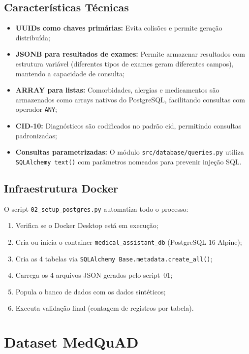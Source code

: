 \subsection{Características Técnicas}

\begin{itemize}
    \item \textbf{UUIDs como chaves primárias:} Evita colisões e permite geração distribuída;
    \item \textbf{JSONB para resultados de exames:} Permite armazenar resultados com estrutura variável (diferentes tipos de exames geram diferentes campos), mantendo a capacidade de consulta;
    \item \textbf{ARRAY para listas:} Comorbidades, alergias e medicamentos são armazenados como arrays nativos do PostgreSQL, facilitando consultas com operador \texttt{ANY};
    \item \textbf{CID-10:} Diagnósticos são codificados no padrão \acrfull{cid}, permitindo consultas padronizadas;
    \item \textbf{Consultas parametrizadas:} O módulo \texttt{src/database/queries.py} utiliza \texttt{SQLAlchemy text()} com parâmetros nomeados para prevenir injeção SQL.
\end{itemize}

\subsection{Infraestrutura Docker}

O script \texttt{02\_setup\_postgres.py} automatiza todo o processo:

\begin{enumerate}
    \item Verifica se o Docker Desktop está em execução;
    \item Cria ou inicia o container \texttt{medical\_assistant\_db} (PostgreSQL 16 Alpine);
    \item Cria as 4 tabelas via \texttt{SQLAlchemy Base.metadata.create\_all()};
    \item Carrega os 4 arquivos JSON gerados pelo script~01;
    \item Popula o banco de dados com os dados sintéticos;
    \item Executa validação final (contagem de registros por tabela).
\end{enumerate}

\section{Dataset MedQuAD}

